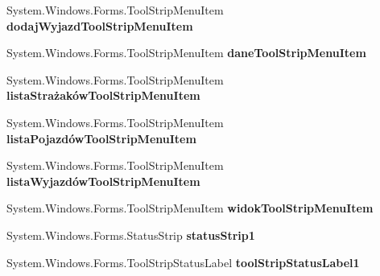 \begin{DoxyCompactItemize}
\mbox{\label{class_statystyki___o_s_p_1_1_menu_glowne_ad2055bcde342893c1c6b80713f3b5998}} 
System.\+Windows.\+Forms.\+Tool\+Strip\+Menu\+Item {\bfseries dodaj\+Wyjazd\+Tool\+Strip\+Menu\+Item}
\item 
\mbox{\label{class_statystyki___o_s_p_1_1_menu_glowne_a30e8df04130f42f454dd9ab8a6e66fcf}} 
System.\+Windows.\+Forms.\+Tool\+Strip\+Menu\+Item {\bfseries dane\+Tool\+Strip\+Menu\+Item}
\item 
\mbox{\label{class_statystyki___o_s_p_1_1_menu_glowne_aa26b763f561652a0f07191d1cd36ea60}} 
System.\+Windows.\+Forms.\+Tool\+Strip\+Menu\+Item {\bfseries lista\+Strażaków\+Tool\+Strip\+Menu\+Item}
\item 
\mbox{\label{class_statystyki___o_s_p_1_1_menu_glowne_a1a132624dd846934f29af49ae00591a3}} 
System.\+Windows.\+Forms.\+Tool\+Strip\+Menu\+Item {\bfseries lista\+Pojazdów\+Tool\+Strip\+Menu\+Item}
\item 
\mbox{\label{class_statystyki___o_s_p_1_1_menu_glowne_a0e32e47147822a755f68442a315cbff9}} 
System.\+Windows.\+Forms.\+Tool\+Strip\+Menu\+Item {\bfseries lista\+Wyjazdów\+Tool\+Strip\+Menu\+Item}
\item 
\mbox{\label{class_statystyki___o_s_p_1_1_menu_glowne_a23eea63ac589501272ddbc4ba7ffa2ee}} 
System.\+Windows.\+Forms.\+Tool\+Strip\+Menu\+Item {\bfseries widok\+Tool\+Strip\+Menu\+Item}
\item 
\mbox{\label{class_statystyki___o_s_p_1_1_menu_glowne_a3c75a808e004720446749eebaf260ad1}} 
System.\+Windows.\+Forms.\+Status\+Strip {\bfseries status\+Strip1}
\item 
\mbox{\label{class_statystyki___o_s_p_1_1_menu_glowne_a2af09402f5dbe009359067bdaa6bdd67}} 
System.\+Windows.\+Forms.\+Tool\+Strip\+Status\+Label {\bfseries tool\+Strip\+Status\+Label1}
\item 
\mbox{\label{class_statystyki___o_s_p_1_1_menu_glowne_a6713e447739d7b56dda423b39a3ca37d}} 

\end{DoxyCompactItemize}
